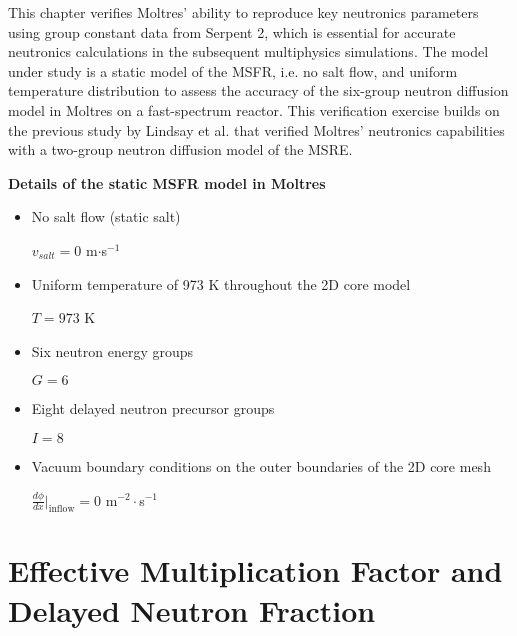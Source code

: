 This chapter verifies Moltres' ability to reproduce key neutronics parameters
using group constant data from Serpent 2, which is essential for accurate
neutronics calculations in the subsequent multiphysics simulations. The model
under study is a static model of the \gls{MSFR}, i.e. no salt flow, and
uniform temperature distribution to assess the accuracy of the
six-group neutron diffusion model in Moltres on a fast-spectrum reactor. This
verification exercise builds on the previous study by Lindsay et al.
\cite{lindsay_introduction_2018} that verified Moltres' neutronics
capabilities with a two-group neutron diffusion model of the \gls{MSRE}.

\textbf{Details of the static \gls{MSFR} model in Moltres}
\begin{itemize}
    \item No salt flow (static salt)
    \begin{center}
        $v_{salt} = 0$ m$\cdot$s$^{-1}$
    \end{center}
    \item Uniform temperature of 973 K throughout the 2D core model
    \begin{center}
        $T = 973$ K
    \end{center}
    \item Six neutron energy groups
    \begin{center}
        $G = 6$
    \end{center}
    \item Eight delayed neutron precursor groups
    \begin{center}
        $I = 8$
    \end{center}
    \item Vacuum boundary conditions on the outer boundaries of the 2D core
    mesh
    \begin{center}
        $\frac{d \phi}{dx}\big|_{\text{inflow}} = 0$ m$^{-2}\cdot$s$^{-1}$
    \end{center}
\end{itemize}

\section{Effective Multiplication Factor and Delayed Neutron Fraction}

